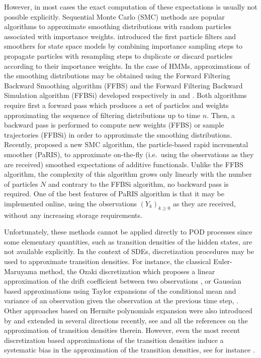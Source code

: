 \documentclass[12pt]{article}
\newcommand{\1}{\mathrm{1}}
\begin{document}
However, in most cases the exact computation of these expectations is usually not possible explicitly. Sequential Monte Carlo (SMC) methods are popular algorithms to approximate smoothing distributions with random particles associated with importance weights. 
 \cite{gordon:salmond:smith:1993,kitagawa:1996} introduced the first particle filters and smoothers for state space models by combining importance sampling steps to propagate particles with resampling steps to duplicate or discard particles according to their importance weights.
In the case of HMMs, approximations of the smoothing distributions may be obtained using the Forward Filtering Backward Smoothing algorithm (FFBS) and  the Forward Filtering Backward Simulation algorithm (FFBSi) developed respectively in \cite{kitagawa:1996,huerzeler:kunsch:1998,doucet:godsill:andrieu:2000} and \cite{godsill:doucet:west:2004}. 
Both algorithms require first a forward pass which produces a set of particles and weights approximating the sequence of filtering distributions up to time $n$. 
Then, a backward pass is performed to compute new weights (FFBS) or sample trajectories (FFBSi) in order to approximate the smoothing distributions. Recently, \cite{olsson:westerborn:2016} proposed a new SMC algorithm, the particle-based rapid incremental smoother (PaRIS), to approximate on-the-fly (i.e.\ using the observations as they are received) smoothed expectations of additive functionals. 
Unlike the FFBS algorithm, the complexity of this algorithm grows only linearly with the number of particles $N$ and contrary to the FFBSi algorithm, no backward pass is required.
 One of the best features of PaRIS algorithm is that it may be implemented online, using the observations $(Y_k)_{k\ge 0}$ as they are received, without any increasing storage requirements.

Unfortunately, these methods cannot be applied directly to POD processes since some elementary quantities, such as transition densities of the hidden states, are not available explicitly.
  In the context of SDEs,  discretization procedures may be used to approximate transition densities.
   For instance, the classical Euler-Maruyama method, the Ozaki discretization which proposes a linear approximation of the drift coefficient between two observations \cite{ozaki:1992,shoji:1998}, or Gaussian based approximations using Taylor expansions of the conditional mean and variance of an observation given the observation at the previous time step, \cite{kessler:1997,kessler:lindner:sorensen:2012,uchida:yoshida:2012}.
   Other approaches based on Hermite polynomials expansion were also introduced by \cite{ait-sahalia:1999,ait-sahalia:2002,ait-sahalia:2008} and extended in several directions recently, see \cite{li:2013} and all the references on the approximation of transition densities therein.
    However, even the most recent discretization based approximations of the transition densities induce a systematic bias in the approximation of the transition densities, see for instance \cite{delmoral:jacod:protter:2001}.
   
\end{document}
